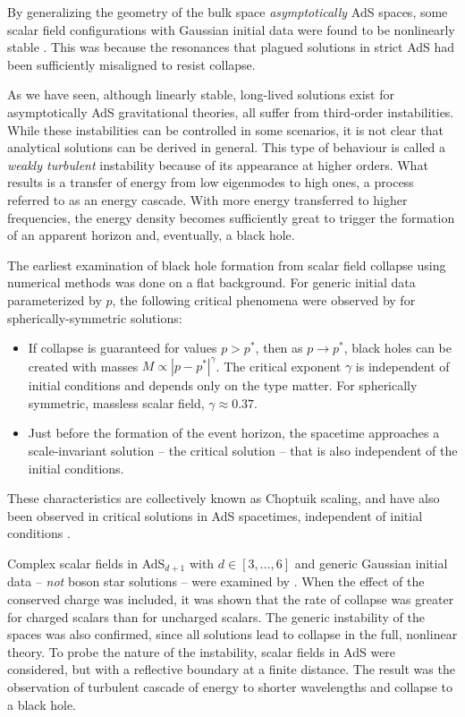 \documentclass[../PhD.tex]{subfiles}
\begin{document}
By generalizing the geometry of the bulk space \emph{asymptotically} AdS spaces, some scalar field configurations with Gaussian initial data were found to be nonlinearly stable \cite{1208.5772}. This was because the resonances that plagued solutions in strict AdS had been sufficiently misaligned to resist collapse. 


As we have seen, although linearly stable, long-lived solutions exist for asymptotically AdS gravitational theories, all suffer from third-order instabilities. While these instabilities can be controlled in some scenarios, it is not clear that analytical solutions can be derived in general. This type of behaviour is called a \emph{weakly turbulent} instability because of its appearance at higher orders. What results is a transfer of energy from low eigenmodes to high ones, a process referred to as an energy cascade. With more energy transferred to higher frequencies, the energy density becomes sufficiently great to trigger the formation of an apparent horizon and, eventually, a black hole.

The earliest examination of black hole formation from scalar field collapse using numerical methods was done on a flat background. For generic initial data parameterized by $p$, the following critical phenomena were observed by \cite{Choptuik:1992jv} for spherically-symmetric solutions:
\begin{itemize}
\item If collapse is guaranteed for values $p > p^*$, then as $p \to p^*$, black holes can be created with masses $M \propto |p - p^*|^\gamma$. The critical exponent $\gamma$ is independent of initial conditions and depends only on the type matter. For spherically symmetric, massless scalar field, $\gamma \approx 0.37$.
\item Just before the formation of the event horizon, the spacetime approaches a scale-invariant solution -- the critical solution -- that is also independent of the initial conditions.
\end{itemize}

These characteristics are collectively known as Choptuik scaling, and have also been observed in critical solutions in AdS spacetimes, independent of initial conditions \cite{hep-th/0101194, gr-qc/0210101}.

Complex scalar fields in AdS$_{d+1}$ with $d \in [3,\ldots,6]$ and generic Gaussian initial data -- \emph{not} boson star solutions -- were examined by \cite{1210.0890}. When the effect of the conserved charge was included, it was shown that the rate of collapse was greater for charged scalars than for uncharged scalars. The generic instability of the spaces was also confirmed, since all solutions lead to collapse in the full, nonlinear theory. To probe the nature of the instability, scalar fields in AdS were considered, but with a reflective boundary at a finite distance. The result was the observation of turbulent cascade of energy to shorter wavelengths and collapse to a black hole. 
\end{document}
